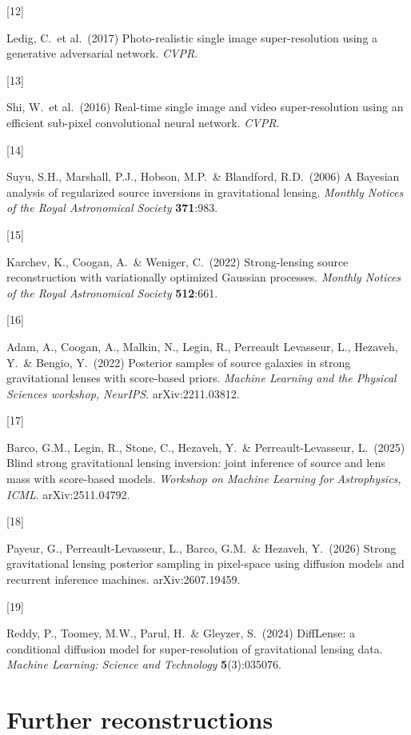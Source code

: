 \documentclass{article}
\begin{document}
{\hypertarget{ref12}{[12]} Ledig, C.\ et al.\ (2017) Photo-realistic single image super-resolution
using a generative adversarial network. {\it CVPR}.

\hypertarget{ref13}{[13]} Shi, W.\ et al.\ (2016) Real-time single image and video super-resolution
using an efficient sub-pixel convolutional neural network. {\it CVPR}.

\hypertarget{ref14}{[14]} Suyu, S.H., Marshall, P.J., Hobson, M.P.\ \& Blandford, R.D.\ (2006) A
Bayesian analysis of regularized source inversions in gravitational lensing.
{\it Monthly Notices of the Royal Astronomical Society} {\bf 371}:983.

\hypertarget{ref15}{[15]} Karchev, K., Coogan, A.\ \& Weniger, C.\ (2022) Strong-lensing source
reconstruction with variationally optimized Gaussian processes.
{\it Monthly Notices of the Royal Astronomical Society} {\bf 512}:661.

\hypertarget{ref16}{[16]} Adam, A., Coogan, A., Malkin, N., Legin, R., Perreault
Levasseur, L., Hezaveh, Y.\ \& Bengio, Y.\ (2022) Posterior samples of source
galaxies in strong gravitational lenses with score-based priors. {\it Machine
Learning and the Physical Sciences workshop, NeurIPS}. arXiv:2211.03812.

\hypertarget{ref17}{[17]} Barco, G.M., Legin, R., Stone, C., Hezaveh, Y.\ \&
Perreault-Levasseur, L.\ (2025) Blind strong gravitational lensing inversion:
joint inference of source and lens mass with score-based models. {\it Workshop on
Machine Learning for Astrophysics, ICML}. arXiv:2511.04792.

\hypertarget{ref18}{[18]} Payeur, G., Perreault-Levasseur, L., Barco, G.M.\ \&
Hezaveh, Y.\ (2026) Strong gravitational lensing posterior sampling in
pixel-space using diffusion models and recurrent inference machines.
arXiv:2607.19459.

\hypertarget{ref19}{[19]} Reddy, P., Toomey, M.W., Parul, H.\ \& Gleyzer, S.\
(2024) DiffLense: a conditional diffusion model for super-resolution of
gravitational lensing data. {\it Machine Learning: Science and Technology}
{\bf 5}(3):035076.

}


\appendix

\section{Further reconstructions}
\label{app:pipeline_extra}
\end{document}
